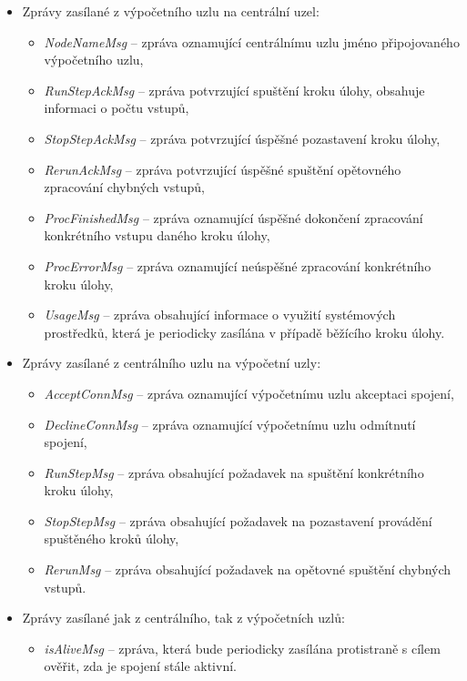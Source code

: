 \begin{itemize}
    \item Zprávy zasílané z výpočetního uzlu na centrální uzel:
        \begin{itemize}
            \item \textit{NodeNameMsg} -- zpráva oznamující centrálnímu uzlu jméno připojovaného výpočetního uzlu,
            \item \textit{RunStepAckMsg} -- zpráva potvrzující spuštění kroku úlohy, obsahuje informaci o počtu vstupů,
            \item \textit{StopStepAckMsg} -- zpráva potvrzující úspěšné pozastavení kroku úlohy,
            \item \textit{RerunAckMsg} -- zpráva potvrzující úspěšné spuštění opětovného zpracování chybných vstupů,
            \item \textit{ProcFinishedMsg} -- zpráva oznamující úspěšné dokončení zpracování konkrétního vstupu daného kroku úlohy,
            \item \textit{ProcErrorMsg} -- zpráva oznamující neúspěšné zpracování konkrétního kroku úlohy,
            \item \textit{UsageMsg} -- zpráva obsahující informace o využití systémových prostředků, která je periodicky zasílána v případě běžícího kroku úlohy.
        \end{itemize}
    \item Zprávy zasílané z centrálního uzlu na výpočetní uzly:
        \begin{itemize}
            \item \textit{AcceptConnMsg} -- zpráva oznamující výpočetnímu uzlu akceptaci spojení,
            \item \textit{DeclineConnMsg} -- zpráva oznamující výpočetnímu uzlu odmítnutí spojení,
            \item \textit{RunStepMsg} -- zpráva obsahující požadavek na spuštění konkrétního kroku úlohy,
            \item \textit{StopStepMsg} -- zpráva obsahující požadavek na pozastavení provádění spuštěného kroků úlohy,
            \item \textit{RerunMsg} -- zpráva obsahující požadavek na opětovné spuštění chybných vstupů.
        \end{itemize}
    \item Zprávy zasílané jak z centrálního, tak z výpočetních uzlů:
        \begin{itemize}
            \item \textit{isAliveMsg} -- zpráva, která bude periodicky zasílána protistraně s cílem ověřit, zda je spojení stále aktivní.
        \end{itemize}
\end{itemize}

